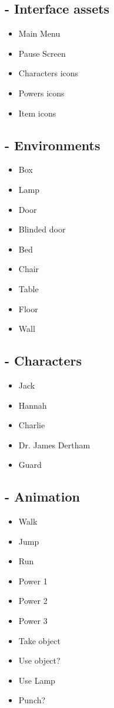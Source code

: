 \subsection{- Interface assets}
\begin{itemize}  
\item Main Menu
\item Pause Screen
\item Characters icons
\item Powers icons
\item Item icons
\end{itemize}


\subsection{- Environments}
\begin{itemize}  
\item Box
\item Lamp
\item Door
\item Blinded door
\item Bed
\item Chair
\item Table
\item Floor
\item Wall
\end{itemize}
        
\subsection{- Characters}
\begin{itemize}  
\item Jack
\item Hannah
\item Charlie
\item Dr. James Dertham
\item Guard
\end{itemize}

\subsection{- Animation}
\begin{itemize}  
\item Walk
\item Jump
\item Run
\item Power 1
\item Power 2
\item Power 3
\item Take object
\item Use object?
\item Use Lamp
\item Punch?
\end{itemize}

